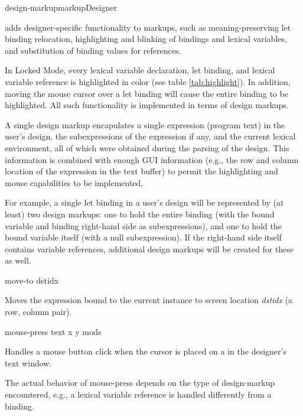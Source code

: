 \documentclass{article}
\begin{document}
\begin{class}{design-markup}{markup}{Designer}

 adds designer-specific functionality to markups,
such as meaning-preserving {\sf let} binding relocation, highlighting and
blinking of bindings and lexical variables, and substitution of
binding values for references.

In Locked Mode, every lexical variable declaration, {\sf let} binding, and
lexical variable reference is highlighted in color (see table
\ref{tab:highlight}).  In addition, moving the mouse cursor over a
{\sf let} binding will cause the entire binding to be highlighted.
All such functionality is implemented in terms of design markups.

A single design markup encapulates a single expression (program text)
in the user's design, the subexpressions of the expression if any, and
the current lexical environment, all of which were obtained during the
parsing of the design.  This information is combined with enough GUI
information (e.g., the row and column location of the expression in
the text buffer) to permit the highlighting and mouse capabilities to
be implemented.

For example, a single {\sf let} binding in a user's design will be
represented by (at least) two design markups: one to hold the entire
binding (with the bound variable and binding right-hand side as
subexpressions), and one to hold the bound variable itself (with a
null subexpression). If the right-hand side itself contains variable
references, additional design markups will be created for these as
well.


\begin{method}{move-to}{ dstidx}{}

Moves the expression bound to the current instance to screen location
{\sl dstidx} (a row, column pair).

\end{method}


\begin{method}{mouse-press}{ text x y mods}{}

Handles a mouse button click when the cursor is placed on a
 in the designer's text window.

The actual behavior of {\sf mouse-press} depends on the type of {\sf
design-markup} encountered, e.g., a lexical variable reference is
handled differently from a binding.

\end{method}



\end{class}
\end{document}
